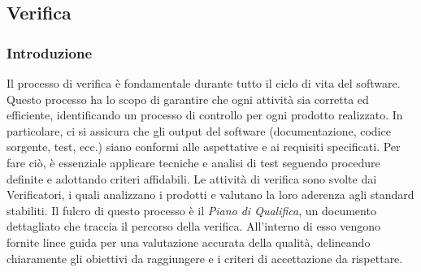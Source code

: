 \subsection{Verifica}
\subsubsection{Introduzione}
Il processo di verifica è fondamentale durante tutto il ciclo di vita del software. Questo processo ha lo scopo di garantire che ogni attività sia corretta ed efficiente, identificando un processo di controllo per ogni prodotto realizzato. In particolare, ci si assicura che gli output del software (documentazione, codice sorgente, test, ecc.) siano conformi alle aspettative e ai requisiti specificati. Per fare ciò, è essenziale applicare tecniche e analisi di test seguendo procedure definite e adottando criteri affidabili. Le attività di verifica sono svolte dai Verificatori, i quali analizzano i prodotti e valutano la loro aderenza agli standard stabiliti. Il fulcro di questo processo è il \textit{Piano di Qualifica}, un documento dettagliato che traccia il percorso della verifica. All'interno di esso vengono fornite linee guida per una valutazione accurata della qualità, delineando chiaramente gli obiettivi da raggiungere e i criteri di accettazione da rispettare.

